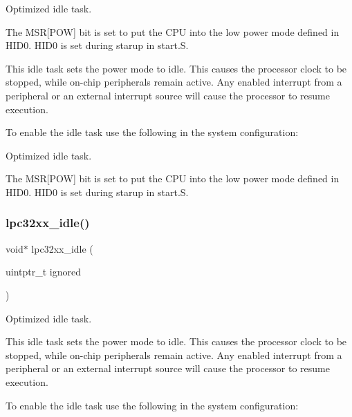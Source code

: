 Optimized idle task.

The M\+SR\mbox{[}P\+OW\mbox{]} bit is set to put the C\+PU into the low power mode defined in H\+I\+D0. H\+I\+D0 is set during starup in start.\+S.

This idle task sets the power mode to idle. This causes the processor clock to be stopped, while on-\/chip peripherals remain active. Any enabled interrupt from a peripheral or an external interrupt source will cause the processor to resume execution.

To enable the idle task use the following in the system configuration\+:


\begin{DoxyCode}{0}
\DoxyCodeLine{\textcolor{preprocessor}{\#include <bsp.h>}}
\DoxyCodeLine{}
\DoxyCodeLine{\textcolor{preprocessor}{\#define CONFIGURE\_INIT}}
\DoxyCodeLine{}
\DoxyCodeLine{\textcolor{preprocessor}{\#define CONFIGURE\_IDLE\_TASK\_BODY bsp\_idle\_thread}}
\DoxyCodeLine{}
\end{DoxyCode}


Optimized idle task.

The M\+SR\mbox{[}P\+OW\mbox{]} bit is set to put the C\+PU into the low power mode defined in H\+I\+D0. H\+I\+D0 is set during starup in start.\+S. \mbox{\label{group__RTEMSBSPsARMLPC32XX_gae59fa9eb85e332e4e50b50ac63158410}} 
\subsubsection{\texorpdfstring{lpc32xx\_idle()}{lpc32xx\_idle()}}
{\footnotesize\ttfamily void$\ast$ lpc32xx\+\_\+idle (\begin{DoxyParamCaption}\item[{uintptr\+\_\+t}]{ignored }\end{DoxyParamCaption})}



Optimized idle task. 

This idle task sets the power mode to idle. This causes the processor clock to be stopped, while on-\/chip peripherals remain active. Any enabled interrupt from a peripheral or an external interrupt source will cause the processor to resume execution.

To enable the idle task use the following in the system configuration\+:


